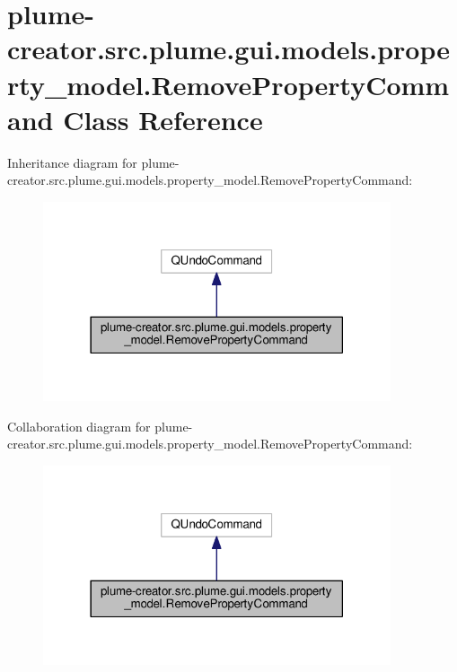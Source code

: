 \hypertarget{classplume-creator_1_1src_1_1plume_1_1gui_1_1models_1_1property__model_1_1_remove_property_command}{}\section{plume-\/creator.src.\+plume.\+gui.\+models.\+property\+\_\+model.\+Remove\+Property\+Command Class Reference}
\label{classplume-creator_1_1src_1_1plume_1_1gui_1_1models_1_1property__model_1_1_remove_property_command}


Inheritance diagram for plume-\/creator.src.\+plume.\+gui.\+models.\+property\+\_\+model.\+Remove\+Property\+Command\+:\nopagebreak
\begin{figure}[H]
\begin{center}
\leavevmode
\includegraphics[width=290pt]{classplume-creator_1_1src_1_1plume_1_1gui_1_1models_1_1property__model_1_1_remove_property_command__inherit__graph}
\end{center}
\end{figure}


Collaboration diagram for plume-\/creator.src.\+plume.\+gui.\+models.\+property\+\_\+model.\+Remove\+Property\+Command\+:\nopagebreak
\begin{figure}[H]
\begin{center}
\leavevmode
\includegraphics[width=290pt]{classplume-creator_1_1src_1_1plume_1_1gui_1_1models_1_1property__model_1_1_remove_property_command__coll__graph}
\end{center}
\end{figure}
